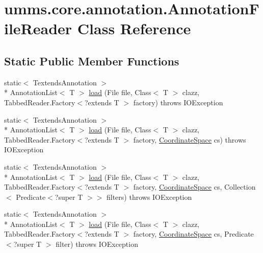 \hypertarget{classumms_1_1core_1_1annotation_1_1_annotation_file_reader}{\section{umms.\+core.\+annotation.\+Annotation\+File\+Reader Class Reference}
\label{classumms_1_1core_1_1annotation_1_1_annotation_file_reader}
}
\subsection*{Static Public Member Functions}
\begin{DoxyCompactItemize}
\item 
static$<$ Textends\+Annotation $>$\\*
 Annotation\+List$<$ T $>$ \hyperlink{classumms_1_1core_1_1annotation_1_1_annotation_file_reader_af94b7d17ba2177ba57de582643bccbd3}{load} (File file, Class$<$ T $>$ clazz, Tabbed\+Reader.\+Factory$<$?extends T $>$ factory)  throws I\+O\+Exception 
\item 
static$<$ Textends\+Annotation $>$\\*
 Annotation\+List$<$ T $>$ \hyperlink{classumms_1_1core_1_1annotation_1_1_annotation_file_reader_a642392bcda0860d984a6ff9d8620d12d}{load} (File file, Class$<$ T $>$ clazz, Tabbed\+Reader.\+Factory$<$?extends T $>$ factory, \hyperlink{interfaceumms_1_1core_1_1coordinatesystem_1_1_coordinate_space}{Coordinate\+Space} cs)  throws I\+O\+Exception 
\item 
static$<$ Textends\+Annotation $>$\\*
 Annotation\+List$<$ T $>$ \hyperlink{classumms_1_1core_1_1annotation_1_1_annotation_file_reader_ab7bfe8a443d18a02c6fe127d999e9588}{load} (File file, Class$<$ T $>$ clazz, Tabbed\+Reader.\+Factory$<$?extends T $>$ factory, \hyperlink{interfaceumms_1_1core_1_1coordinatesystem_1_1_coordinate_space}{Coordinate\+Space} cs, Collection$<$ Predicate$<$?super T $>$$>$ filters)  throws I\+O\+Exception 
\item 
static$<$ Textends\+Annotation $>$\\*
 Annotation\+List$<$ T $>$ \hyperlink{classumms_1_1core_1_1annotation_1_1_annotation_file_reader_a047b4bf9b5873f68166b9457b34402d3}{load} (File file, Class$<$ T $>$ clazz, Tabbed\+Reader.\+Factory$<$?extends T $>$ factory, \hyperlink{interfaceumms_1_1core_1_1coordinatesystem_1_1_coordinate_space}{Coordinate\+Space} cs, Predicate$<$?super T $>$ filter)  throws I\+O\+Exception 
$$
\end{DoxyCompactItemize}
